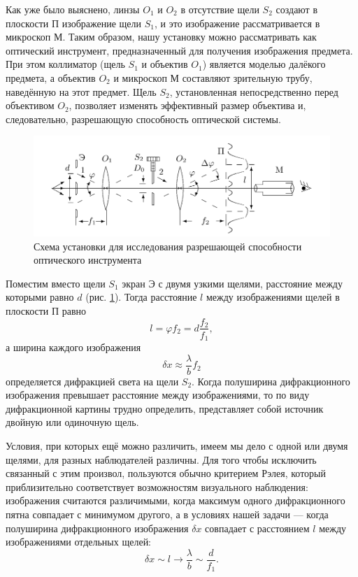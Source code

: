 \documentclass[a4paper,12pt]{article}
\begin{document}
Как уже было выяснено, линзы $O_1$ и $ O_2$ в отсутствие щели $S_2$ создают в плоскости П изображение щели $S_1$, и это изображение рассматривается в микроскоп М. Таким образом, нашу установку можно рассматривать как оптический инструмент, предназначенный для получения изображения предмета. При этом коллиматор (щель $S_1$ и объектив $O_1$) является моделью далёкого предмета, а объектив $O_2$ и микроскоп М составляют зрительную трубу, наведённую на этот предмет.
Щель $S_2$, установленная непосредственно перед объективом $O_2$, позволяет изменять эффективный размер объектива и, следовательно, разрешающую способность оптической системы.

\begin{figure}[H]
	\centering
	\includegraphics[scale=0.]{оптический инструмент.png}
	\caption{Схема установки для исследования разрешающей
		способности оптического инструмента}
	\label{labG}
\end{figure}

Поместим вместо щели $S_1$ экран Э с двумя узкими щелями, расстояние между которыми равно $d$ (рис. \ref{labG}). Тогда расстояние $l$ между изображениями щелей в плоскости П равно
\begin{equation}
l = \varphi f_2 = d \dfrac{f_2}{f_1},
\end{equation}
а ширина каждого изображения
\begin{equation}
\delta x \approx \dfrac{\lambda}{b} f_2
\end{equation}
определяется дифракцией света на щели $S_2$. Когда полуширина дифракционного изображения превышает расстояние между изображениями, то по виду дифракционной картины трудно определить, представляет собой источник двойную или одиночную щель.

Условия, при которых ещё можно различить, имеем мы дело с одной или двумя щелями, для разных наблюдателей различны. Для того чтобы исключить связанный с этим произвол, пользуются обычно критерием Рэлея, который приблизительно соответствует возможностям визуального наблюдения: изображения считаются различимыми, когда максимум одного дифракционного пятна совпадает с минимумом другого, а в условиях нашей задачи --- когда полуширина дифракционного изображения $\delta x$ совпадает с расстоянием $l$ между изображениями отдельных щелей:
\begin{equation}
\delta x \sim l \to \dfrac{\lambda}{b} \sim \dfrac{d}{f_1}.
\end{equation}
\end{document}
